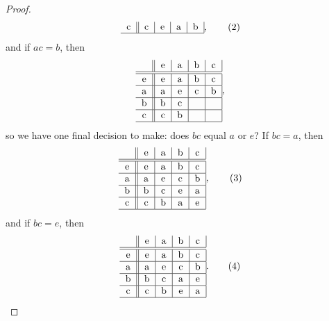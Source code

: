 \documentclass{article}
\theoremstyle{definition}
\begin{document}
\begin{proof}
\begin{equation*}
\begin{tabular}{ c || c | c | c | c | }
			c & c & e & a & b \\ \hline
		\end{tabular}, \tag{2}
	\end{equation*}
	and if $ac = b$, then \begin{equation*}
		\begin{tabular}{ c || c | c | c | c | }
			  & e & a & b & c \\ \hline\hline
			e & e & a & b & c \\ \hline
			a & a & e & c & b \\ \hline
			b & b & c &   &   \\ \hline
			c & c & b &   &   \\ \hline
		\end{tabular},
	\end{equation*}
	so we have one final decision to make: does $bc$ equal $a$ or $e$?
	If $bc = a$, then \begin{equation*}
		\begin{tabular}{ c || c | c | c | c | }
			  & e & a & b & c \\ \hline\hline
			e & e & a & b & c \\ \hline
			a & a & e & c & b \\ \hline
			b & b & c & e & a \\ \hline
			c & c & b & a & e \\ \hline
		\end{tabular}, \tag{3}
	\end{equation*}
	and if $bc = e$, then \begin{equation*}
		\begin{tabular}{ c || c | c | c | c | }
			  & e & a & b & c \\ \hline\hline
			e & e & a & b & c \\ \hline
			a & a & e & c & b \\ \hline
			b & b & c & a & e \\ \hline
			c & c & b & e & a \\ \hline
		\end{tabular}. \tag{4}
	\end{equation*}


\end{proof}
\end{document}
